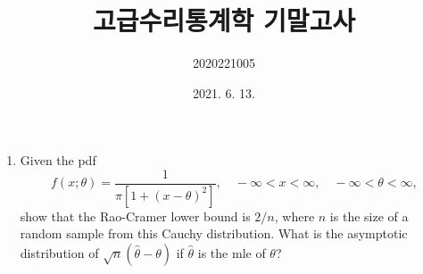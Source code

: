 \documentclass{oblivoir}
\title{ \Huge \textbf{고급수리통계학 기말고사} \vspace{2cm} }
\author{\huge 2020221005 \vspace{4mm} \\ \huge오재권 \vspace{14cm}}
\date{\Large 2021. 6. 13.}
\begin{document}
\maketitle

\newpage
\begin{enumerate}
\item
Given the pdf
$$
f(x;\theta) = \frac{1}{\pi [ 1 + (x - \theta)^2]}, \quad -\infty < x < \infty, \quad -\infty < \theta < \infty,
$$
show that the Rao-Cramer lower bound is $2/n$, where $n$ is the size of a random sample
from this Cauchy distribution. What is the asymptotic distribution of $\sqrt{n} (\hat\theta - \theta)$
if $\hat\theta$ is the mle of $\theta$?


\end{enumerate}
\end{document}
